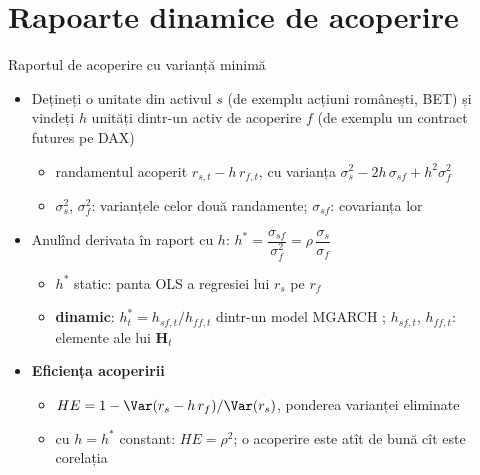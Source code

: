 \section{Rapoarte dinamice de acoperire}

\begin{frame}{Raportul de acoperire cu varianță minimă}
\itemsize{\footnotesize}
\begin{itemize}
    \item Dețineți o unitate din activul $s$ (de exemplu acțiuni românești, BET) și vindeți $h$ unități dintr-un activ de acoperire $f$ (de exemplu un contract futures pe DAX)
    \begin{itemize}
        \item randamentul acoperit $r_{s,t} - h\,r_{f,t}$, cu varianța $\sigma_s^2 - 2h\,\sigma_{sf} + h^2\sigma_f^2$
        \item $\sigma_s^2$, $\sigma_f^2$: varianțele celor două randamente; $\sigma_{sf}$: covarianța lor
    \end{itemize}
    \item Anulînd derivata în raport cu $h$: $h^* = \dfrac{\sigma_{sf}}{\sigma_f^2} = \rho\,\dfrac{\sigma_s}{\sigma_f}$ 
    \begin{itemize}
        \item $h^*$ static: panta OLS a regresiei lui $r_s$ pe $r_f$
        \item \textbf{dinamic}: $h_t^* = h_{sf,t}/h_{ff,t}$ dintr-un model MGARCH ; $h_{sf,t}$, $h_{ff,t}$: elemente ale lui $\mathbf{H}_t$
    \end{itemize}
    \item \textbf{Eficiența acoperirii}
    \begin{itemize}
        \item $HE = 1 - \Var(r_s - h\,r_f)/\Var(r_s)$, ponderea varianței eliminate
        \item cu $h = h^*$ constant: $HE = \rho^2$; o acoperire este atît de bună cît este corelația
    \end{itemize}
\end{itemize}
\end{frame}

